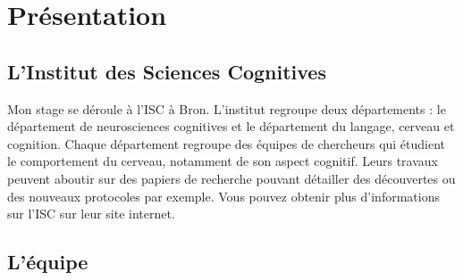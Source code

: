 \section{Présentation}

\subsection{L'Institut des Sciences Cognitives}

Mon stage se déroule à l'\gls{ISC} à Bron. L'institut regroupe deux départements : le département de neurosciences cognitives et le département du langage, cerveau et cognition.
Chaque département regroupe des équipes de chercheurs qui étudient le comportement du cerveau, notamment de son aspect cognitif. Leurs travaux peuvent aboutir sur des papiers de
recherche pouvant détailler des découvertes ou des nouveaux protocoles par exemple. Vous pouvez obtenir plus d'informations sur l'\gls{ISC} sur leur site internet\cite{ISC00}.

\subsection{L'équipe}

\newpage